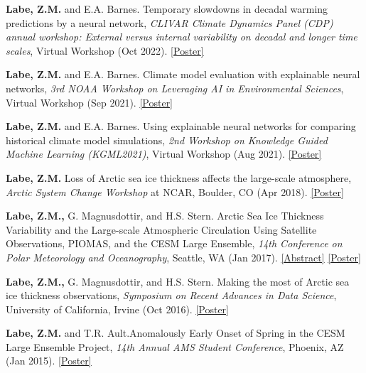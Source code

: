 \documentclass[margin,line,palatino,courier,10pt]{res}
\begin{document}
\begin{resume}
\begin{etaremune}[leftmargin=0in,topsep=0in,parsep=0in]
\item \textbf{Labe, Z.M.} and E.A. Barnes. Temporary slowdowns in decadal warming predictions by a neural network, \textit{CLIVAR Climate Dynamics Panel (CDP) annual workshop: External versus internal variability on decadal and longer time scales}, Virtual Workshop (Oct 2022). \href{https://zacklabe.files.wordpress.com/2022/09/labebarnes_poster_10-2022.pdf}{[Poster]}
\item \textbf{Labe, Z.M.} and E.A. Barnes. Climate model evaluation with explainable neural networks, \textit{3rd NOAA Workshop on Leveraging AI in Environmental Sciences}, Virtual Workshop (Sep 2021). \href{https://zacklabe.files.wordpress.com/2022/08/b875c-labebarnes_noaa-aies_2021_poster.pdf}{[Poster]}
\item \textbf{Labe, Z.M.} and E.A. Barnes. Using explainable neural networks for comparing historical climate model simulations, \textit{2nd Workshop on Knowledge Guided Machine Learning (KGML2021)}, Virtual Workshop (Aug 2021). \href{https://zacklabe.files.wordpress.com/2022/08/aa648-labebarnes_kgml2021_poster_v2_final.pdf}{[Poster]}
\item \textbf{Labe, Z.M.} Loss of Arctic sea ice thickness affects the large-scale atmosphere, \textit{Arctic System Change Workshop} at NCAR, Boulder, CO (Apr 2018). \href{https://zacklabe.files.wordpress.com/2022/08/ff668-zlabe_042018_bigideaposter.pdf}{[Poster]}
\item \textbf{Labe, Z.M.,} G. Magnusdottir, and H.S. Stern. Arctic Sea Ice Thickness Variability and the Large-scale Atmospheric Circulation Using Satellite Observations, PIOMAS, and the CESM Large Ensemble, \textit{14th Conference on Polar Meteorology and Oceanography}, Seattle, WA (Jan 2017). \href{https://ams.confex.com/ams/97Annual/webprogram/Paper313445.html}{[Abstract]} \href{https://zacklabe.files.wordpress.com/2022/08/c332e-zlabemagnusdottirstern_amsposter_2017.pdf}{[Poster]}
\item \textbf{Labe, Z.M.,} G. Magnusdottir, and H.S. Stern. Making the most of Arctic sea ice thickness observations, \textit{Symposium on Recent Advances in Data Science}, University of California, Irvine (Oct 2016). \href{https://zacklabe.files.wordpress.com/2022/08/c4b1e-zlabemagnusdottirstern_dsiposter_oct16.pdf}{[Poster]}
\item \textbf{Labe, Z.M.} and T.R. Ault.\@ Anomalously Early Onset of Spring in the CESM Large Ensemble Project, \textit{14th Annual AMS Student Conference}, Phoenix, AZ (Jan 2015). \href{https://ams.confex.com/ams/95Annual/webprogram/Paper271063.html}{[Poster]}


\end{etaremune}
\end{resume}
\end{document}
